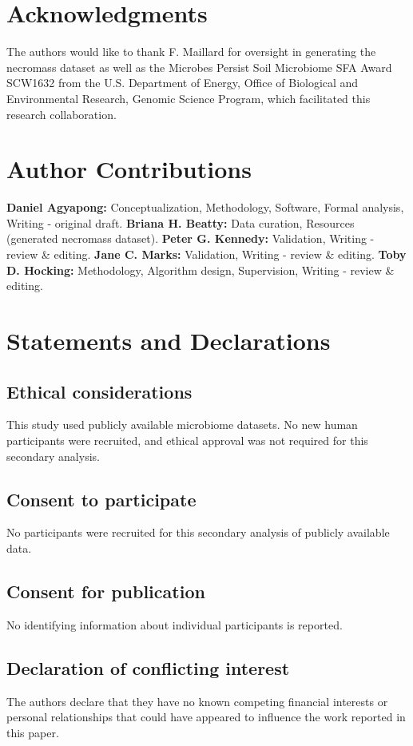 \documentclass[]{Liebert_Author_revised}
\begin{document}
\section*{Acknowledgments}
The authors would like to thank F. Maillard for oversight in generating the necromass dataset as well as the Microbes Persist Soil Microbiome SFA Award SCW1632 from the U.S. Department of Energy, Office of Biological and Environmental Research, Genomic Science Program, which facilitated this research collaboration.

\section*{Author Contributions}
\textbf{Daniel Agyapong:} Conceptualization, Methodology, Software, Formal analysis, Writing - original draft.
\textbf{Briana H. Beatty:} Data curation, Resources (generated necromass dataset).
\textbf{Peter G. Kennedy:} Validation, Writing - review \& editing.
\textbf{Jane C. Marks:} Validation, Writing - review \& editing.
\textbf{Toby D. Hocking:} Methodology, Algorithm design, Supervision, Writing - review \& editing.

\section*{Statements and Declarations}
\subsection*{Ethical considerations}
This study used publicly available microbiome datasets. No new human participants were recruited, and ethical approval was not required for this secondary analysis.

\subsection*{Consent to participate}
No participants were recruited for this secondary analysis of publicly available data.

\subsection*{Consent for publication}
No identifying information about individual participants is reported.

\subsection*{Declaration of conflicting interest}
The authors declare that they have no known competing financial interests or personal relationships that could have appeared to influence the work reported in this paper.
\end{document}
